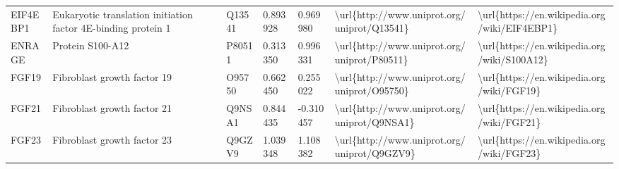 \begin{table}[]
\begin{tabular}{lllllll}
\multicolumn{1}{l|}{EIF4EBP1} & Eukaryotic translation initiation factor 4E-binding protein 1 & Q13541  & 0.893928           & 0.969980          & \textbackslash{}url\{http://www.uniprot.org/uniprot/Q13541\} & \textbackslash{}url\{https://en.wikipedia.org/wiki/EIF4EBP1\}                                                                                                                                                                                                                                      \\
\multicolumn{1}{l|}{ENRAGE}   & Protein S100-A12                                              & P80511  & 0.313350           & 0.996331          & \textbackslash{}url\{http://www.uniprot.org/uniprot/P80511\} & \textbackslash{}url\{https://en.wikipedia.org/wiki/S100A12\}                                                                                                                                                                                                                                       \\
\multicolumn{1}{l|}{FGF19}    & Fibroblast growth factor 19                                   & O95750  & 0.662450           & 0.255022          & \textbackslash{}url\{http://www.uniprot.org/uniprot/O95750\} & \textbackslash{}url\{https://en.wikipedia.org/wiki/FGF19\}                                                                                                                                                                                                                                         \\
\multicolumn{1}{l|}{FGF21}    & Fibroblast growth factor 21                                   & Q9NSA1  & 0.844435           & -0.310457         & \textbackslash{}url\{http://www.uniprot.org/uniprot/Q9NSA1\} & \textbackslash{}url\{https://en.wikipedia.org/wiki/FGF21\}                                                                                                                                                                                                                                         \\
\multicolumn{1}{l|}{FGF23}    & Fibroblast growth factor 23                                   & Q9GZV9  & 1.039348           & 1.108382          & \textbackslash{}url\{http://www.uniprot.org/uniprot/Q9GZV9\} & \textbackslash{}url\{https://en.wikipedia.org/wiki/FGF23\}                                                                                                                                                                                                                                         \\

\end{tabular}
\end{table}
